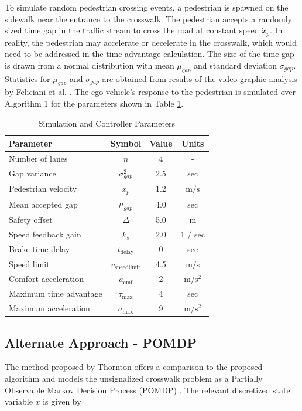 \documentclass[letterpaper, 10 pt, conference]{ieeeconf} %
\begin{document}
To simulate random pedestrian crossing events, a pedestrian is spawned on the sidewalk near the entrance to the crosswalk. The pedestrian accepts a randomly sized time gap in the traffic stream to cross the road at constant speed $\dot{x}_p$. In reality, the pedestrian may accelerate or decelerate in the crosswalk, which would need to be addressed in the time advantage calculation. The size of the time gap is drawn from a normal distribution with mean $\mu_{gap}$ and standard deviation $\sigma_{gap}$. Statistics for $\mu_{gap}$ and $\sigma_{gap}$ are obtained from results of the video graphic analysis by Feliciani et al. \cite{Feliciani2017}. The ego vehicle's response to the pedestrian is simulated over Algorithm 1 for the parameters shown in Table \ref{tb:params}. 

\begin{table}[h]
\begin{center}
\caption{Simulation and Controller Parameters}\label{tb:params}
\begin{tabular}{lccc}
Parameter & Symbol & Value & Units \\\hline\hline
Number of lanes & $n$ & 4 & - \\
Gap variance & $\sigma^2_{gap}$ & 2.5 & sec\\
Pedestrian velocity & $\dot{x}_p$ & 1.2 & $\mathrm{m/s}$ \\
Mean accepted gap & $\mu_{gap}$ & 4.0 & sec\\\hline
Safety offset    & $\Delta$ & 5.0 & m \\
Speed feedback gain & $k_s$ & 2.0 & 1 / sec\\
Brake time delay  & $t_\mathrm{delay}$ & 0 & sec \\ 
Speed limit & $v_\mathrm{speedlimit}$ & 4.5 & m/s \\
Comfort acceleration & $a_\mathrm{cmf}$ & 2 & $\mathrm{m/s^2}$ \\
Maximum time advantage & $\tau_\mathrm{max}$ & 4 & sec \\
Maximum acceleration & $a_\mathrm{max}$ & 9 & $\mathrm{m/s^2}$ \\\hline
\end{tabular}
\end{center}
\end{table}

\subsection{Alternate Approach - POMDP}
The method proposed by Thornton \cite{Thornton2018} offers a comparison to the proposed algorithm and models the unsignalized crosswalk problem as a Partially 
Observable Markov Decision Process (POMDP) \cite{Kochenderfer2015}. The relevant discretized state variable $x$ is given by
\end{document}
